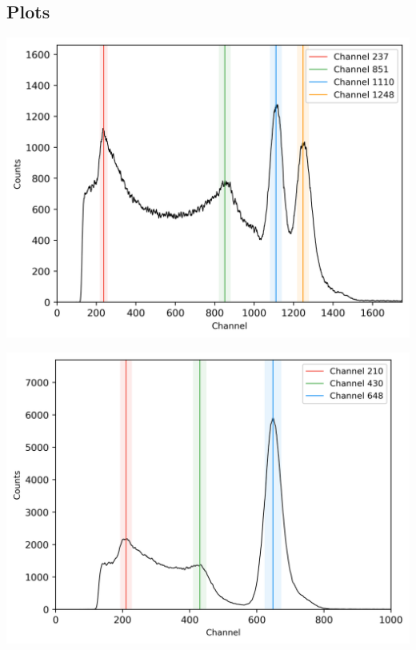 \subsection{Plots}
%
\begin{multicols}{2}
%
\minipage{\linewidth}
    \begin{center}
        \captionsetup{type=figure}
        \begin{adjustbox}{max width=\linewidth, keepaspectratio}
            \includegraphics[]{png/60Co}
        \end{adjustbox}
        \label{fig:Spectrum60Co}
    \end{center}
\endminipage
%
\vspace{10mm}
%
\minipage{\linewidth}
    \begin{center}
        \captionsetup{type=figure}
        \begin{adjustbox}{max width=\linewidth, keepaspectratio}
            \includegraphics[]{png/137Cs}

\end{adjustbox}
\end{center}
\end{multicols}

